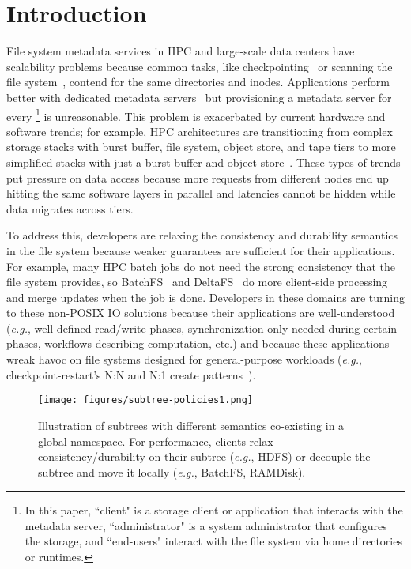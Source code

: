 \section{Introduction}

File system metadata services in HPC and large-scale data centers have
scalability problems because common tasks, like
checkpointing~\cite{bent_plfs_2009} or scanning the file
system~\cite{zheng:pdsw2014-batchfs}, contend for the same directories and
inodes. Applications perform better with dedicated metadata
servers~\cite{sevilla:sc15-mantle, ren:sc2014-indexfs} but provisioning a
metadata server for every \footnote{In this paper, ``client"
is a storage client or application that interacts with the metadata server,
``administrator" is a system administrator that configures the storage, and
``end-users" interact with the file system via home directories or runtimes.  }
is unreasonable. This problem is exacerbated by current hardware and software
trends; for example,  HPC architectures are transitioning from complex storage
stacks with burst buffer, file system, object store, and tape tiers to more
simplified stacks with just a burst buffer and object
store~\cite{bent:login16-hpc-trends}. These types of trends put pressure on
data access because more requests from different nodes end up hitting the same
software layers in parallel and latencies cannot be hidden while data migrates
across tiers.

To address this, developers are relaxing the consistency and durability
semantics in the file system because weaker guarantees are sufficient for their
applications. For example, many HPC batch jobs do not need the strong
consistency that the file system provides, so
BatchFS~\cite{zheng:pdsw2014-batchfs} and DeltaFS~\cite{zheng:pdsw2015-deltafs}
do more client-side processing and merge updates when the job is done.
Developers in these domains are turning to these non-POSIX IO solutions because
their applications are well-understood ({\it e.g.}, well-defined read/write
phases, synchronization only needed during certain phases, workflows describing
computation, etc.) and because these applications wreak havoc on file systems
designed for general-purpose workloads ({\it e.g.}, checkpoint-restart's N:N
and N:1 create patterns~\cite{bent_plfs_2009}).

\begin{figure}[tb] \centering
\texttt{[image: figures/subtree-policies1.png]}
\caption{Illustration of subtrees with different semantics co-existing in a
global namespace.  For performance, clients  relax consistency/durability on their
subtree ({\it e.g.}, HDFS) or decouple the subtree and move it locally ({\it e.g.}, BatchFS, RAMDisk).\vspace{-3ex}
}\label{fig:subtree-policies} \end{figure}

